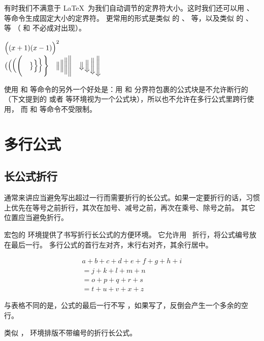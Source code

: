 有时我们不满意于 \LaTeX\ 为我们自动调节的定界符大小。这时我们还可以用 、 等命令生成固定大小的定界符。
更常用的形式是类似  的 、 等，以及类似  的 、 等
（ 和  不必成对出现）。
\begin{example}
$\Bigl((x+1)(x-1)\Bigr)^{2}$\\
$\bigl( \Bigl( \biggl( \Biggl( \quad
\bigr\} \Bigr\} \biggr\} \Biggr\} \quad
\big\| \Big\| \bigg\| \Bigg\| \quad
\big\Downarrow \Big\Downarrow
\bigg\Downarrow \Bigg\Downarrow$
\end{example}

使用  和  等命令的另外一个好处是：用  和  分界符包裹的公式块是不允许断行的
（下文提到的  或者  等环境视为一个公式块），所以也不允许在多行公式里跨行使用，
而  和  等命令不受限制。

\section{多行公式}\label{sec:multi-eqns}

\subsection{长公式折行}\label{subsec:multline}

通常来讲应当避免写出超过一行而需要折行的长公式。如果一定要折行的话，习惯上优先在等号之前折行，其次在加号、减号之前，再次在乘号、除号之前。
其它位置应当避免折行。

 宏包的  环境提供了书写折行长公式的方便环境。
它允许用 \crcmd\ 折行，将公式编号放在最后一行。
多行公式的首行左对齐，末行右对齐，其余行居中。
\begin{example}
\begin{multline}
a + b + c + d + e + f
+ g + h + i \\
= j + k + l + m + n\\
= o + p + q + r + s\\
= t + u + v + x + z
\end{multline}
\end{example}

与表格不同的是，公式的最后一行不写 \crcmd，如果写了，反倒会产生一个多余的空行。

类似 ， 环境排版不带编号的折行长公式。

